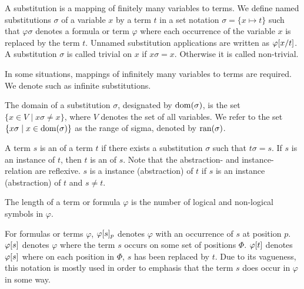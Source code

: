 

A substitution is a mapping of finitely many variables to terms.
We define named substitutions $\sigma$ of a variable $x$ by a term $t$ in a set notation $\sigma = \{ x \mapsto t\}$ such that 
$\varphi\sigma$ denotes a formula or term $\varphi$ where each occurrence of the variable $x$ is replaced by the term $t$.
Unnamed substitution applications are written as $\varphi[x/t]$.
A substitution $\sigma$ is called trivial on $x$ if $x\sigma = x$. Otherwise it is called non-trivial.

In some situations, mappings of infinitely many variables to terms are required. We denote such as infinite substitutions.

The domain of a substitution $\sigma$, designated by $\operatorname{dom}(\sigma)$, is the set $\{x \in V \mid x\sigma \neq x\}$, where $V$ denotes the set of all variables.
We refer to the set $\{x\sigma \mid x\in \operatorname{dom}(\sigma)\}$ as the range of sigma, denoted by $\operatorname{ran}(\sigma)$. 





A term $s$ is an  of a term $t$ if there exists a substitution $\sigma$ such that $t\sigma = s$.
If $s$ is an instance of $t$, then $t$ is an  of $s$. Note that the abstraction- and instance-relation are reflexive. 
$s$ is a  instance (abstraction) of $t$ if $s$ is an instance (abstraction) of $t$ and $s\neq t$.


The length of a term or formula $\varphi$ is the number of logical and non-logical symbols in $\varphi$.

For formulas or terms $\varphi$, $\varphi{\ensuremath{[s]}_{p}}$ denotes $\varphi$ with an occurrence of $s$ at position $p$.
$\varphi[s]$ denotes $\varphi$ where the term $s$ occurs on some set of positions $\Phi$. $\varphi[t]$ denotes $\varphi[s]$ where on each position in $\Phi$, $s$ has been replaced by $t$. Due to its vagueness, this notation is mostly used in order to emphasis that the term $s$ does occur in $\varphi$ in some way.

